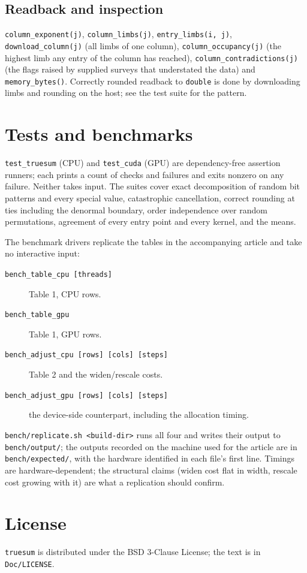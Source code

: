 \documentclass[11pt]{article}
\newcommand{\code}[1]{\texttt{#1}}
\begin{document}
\subsection{Readback and inspection}
\code{column\_exponent(j)}, \code{column\_limbs(j)}, \code{entry\_limbs(i, j)}, \code{download\_column(j)} (all limbs of one column), \code{column\_occupancy(j)} (the highest limb any entry of the column has reached), \code{column\_contradictions(j)} (the flags raised by supplied surveys that understated the data) and \code{memory\_bytes()}. Correctly rounded readback to \code{double} is done by downloading limbs and rounding on the host; see the test suite for the pattern.

\section{Tests and benchmarks}

\code{test\_truesum} (CPU) and \code{test\_cuda} (GPU) are dependency-free assertion runners; each prints a count of checks and failures and exits nonzero on any failure. Neither takes input. The suites cover exact decomposition of random bit patterns and every special value, catastrophic cancellation, correct rounding at ties including the denormal boundary, order independence over random permutations, agreement of every entry point and every kernel, and the means.

The benchmark drivers replicate the tables in the accompanying article and take no interactive input:
\begin{description}
\item[\code{bench\_table\_cpu [threads]}] Table 1, CPU rows.
\item[\code{bench\_table\_gpu}] Table 1, GPU rows.
\item[\code{bench\_adjust\_cpu [rows] [cols] [steps]}] Table 2 and the widen/rescale costs.
\item[\code{bench\_adjust\_gpu [rows] [cols] [steps]}] the device-side counterpart, including the allocation timing.
\end{description}
\code{bench/replicate.sh <build-dir>} runs all four and writes their output to \code{bench/output/}; the outputs recorded on the machine used for the article are in \code{bench/expected/}, with the hardware identified in each file's first line. Timings are hardware-dependent; the structural claims (widen cost flat in width, rescale cost growing with it) are what a replication should confirm.

\section{License}

\code{truesum} is distributed under the BSD 3-Clause License; the text is in \code{Doc/LICENSE}.
\end{document}
